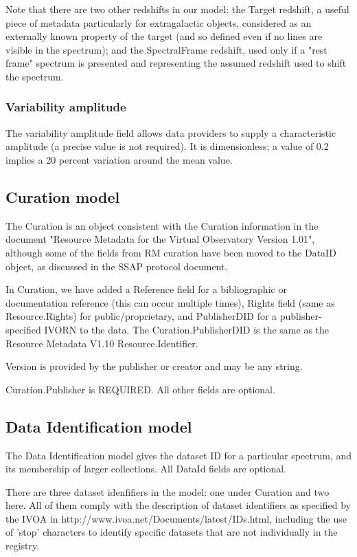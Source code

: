 \documentclass[11pt]{article}
\begin{document}
Note that there are two other redshifts in our model: the Target redshift,
a useful piece of metadata particularly for extragalactic objects,
considered as an externally known property of the target (and so defined
even if no lines are visible in the spectrum); and the SpectralFrame
redshift, used only if a "rest frame" spectrum is presented and
representing the assumed redshift used to shift the spectrum.

\subsubsection{Variability amplitude}

The variability amplitude field allows data providers to supply
a characteristic amplitude (a precise value is not required).
It is dimensionless; a value of 0.2 implies a 20 percent variation
around the mean value.



\subsection{Curation model}

The Curation is an object consistent with the Curation information in
the document "Resource Metadata for the Virtual Observatory Version
1.01",
although some of the fields from RM curation have been moved to the DataID
object, as discussed in the SSAP protocol document.


In Curation, we have added a Reference field for a bibliographic or documentation
reference (this can occur multiple times), Rights field (same as Resource.Rights)
for public/proprietary, and PublisherDID
for a publisher-specified IVORN to the data. The Curation.PublisherDID
is the same as the Resource Metadata V1.10 Resource.Identifier.

Version is provided by the publisher or creator and may be any string.
 
Curation.Publisher is REQUIRED. All other
fields are optional.  


\subsection{Data Identification model}


The Data Identification model gives the dataset ID for a particular
spectrum, and its membership of larger collections.
All DataId fields are optional. 

There are three dataset idenfifiers in the model: one under Curation
and two here. All of them comply with the description of dataset identifiers
as specified by the IVOA in http://www.ivoa.net/Documents/latest/IDs.html,
including the use of 'stop' characters to identify specific datasets
that are not individually in the registry.
 
\end{document}
